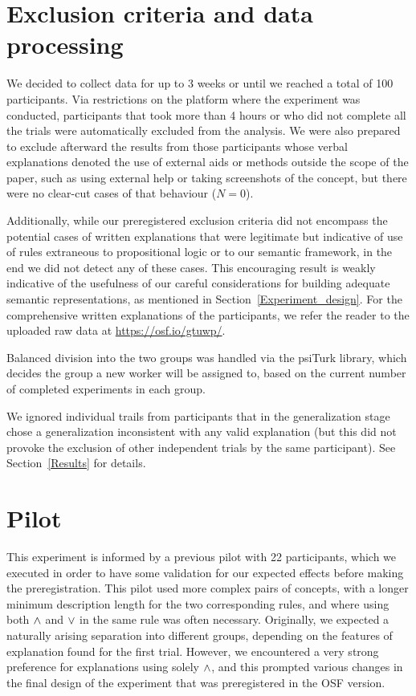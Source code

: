 \newpage
\begin{appendices}
\section{Exclusion criteria and data processing}\label{Sec:ExclusionCriteria}

We decided to collect data for up to 3 weeks or until we reached a total of 100 participants. Via restrictions on the platform where the experiment was conducted, participants that took more than 4 hours or who did not complete all the trials were automatically excluded from the analysis. We were also prepared to exclude afterward the results from those participants whose verbal explanations denoted the use of external aids or methods outside the scope of the paper, such as using external help or taking screenshots of the concept, but there were no clear-cut cases of that behaviour ($N=0$).  

 Additionally, while our preregistered exclusion criteria did not encompass the potential cases of written explanations that were legitimate but indicative of use of rules extraneous to propositional logic or to our semantic framework, in the end we did not detect any of these cases. This encouraging result is weakly indicative of the usefulness of our careful considerations for building adequate semantic representations, as mentioned in Section~\ref{Experiment_design}. For the comprehensive written explanations of the participants, we refer the reader to the uploaded raw data at \url{https://osf.io/gtuwp/}.  


Balanced division into the two groups was handled via the psiTurk library, which decides the group a new worker will be assigned to, based on the current number of completed experiments in each group. 

 We ignored individual trails from participants that in the generalization stage chose a generalization inconsistent with any valid explanation (but this did not provoke the exclusion of other independent trials by the same participant). See Section~\ref{Results} for details. 


\section{Pilot} \label{subsection:resultsPilot}
This experiment  is  informed by a previous pilot with 22 participants, which we executed in order to have some validation for our expected effects before making the preregistration. This pilot used more complex pairs of concepts, with a longer minimum description length for the two corresponding rules, and where using both $\land$ and $\lor$ in the same rule was often necessary. 
Originally, we expected a naturally arising separation into different groups, depending on the features of explanation found for the first trial. However, we encountered a very strong preference for explanations using solely $\land$, and this prompted various changes in the final design of the experiment that was preregistered in the OSF version.


\end{appendices}
